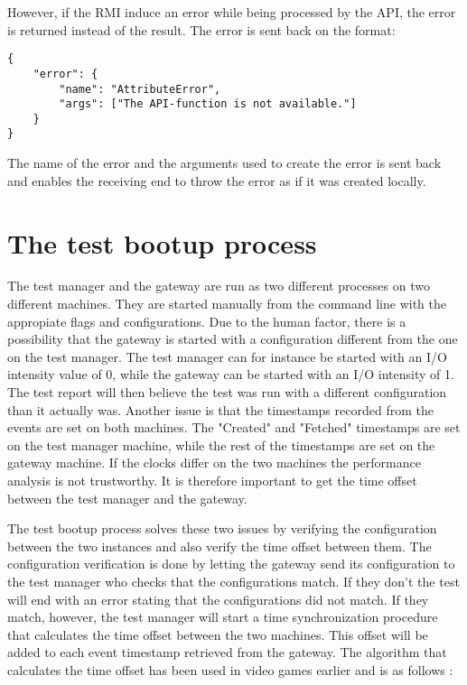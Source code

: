 However, if the RMI induce an error while being processed by the API, the error
is returned instead of the result. The error is sent back on the format:

\begin{lstlisting}
{
    "error": {
        "name": "AttributeError",
        "args": ["The API-function is not available."]
    }
}
\end{lstlisting}

The name of the error and the arguments used to create the error is sent back
and enables the receiving end to throw the error as if it was created locally.

\section{The test bootup process}

The test manager and the gateway are run as two different processes on two
different machines. They are started manually from the command line with the
appropiate flags and configurations. Due to the human factor, there is a
possibility that the gateway is started with a configuration different from the
one on the test manager. The test manager can for instance be started with an
I/O intensity value of 0, while the gateway can be started with an I/O
intensity of 1. The test report will then believe the test was run with a
different configuration than it actually was. Another issue is that the
timestamps recorded from the events are set on both machines. The "Created" and
"Fetched" timestamps are set on the test manager machine, while the rest of the
timestamps are set on the gateway machine. If the clocks differ on the two
machines the performance analysis is not trustworthy. It is therefore important
to get the time offset between the test manager and the gateway.

The test bootup process solves these two issues by verifying the configuration
between the two instances and also verify the time offset between them. The
configuration verification is done by letting the gateway send its
configuration to the test manager who checks that the configurations match. If
they don't the test will end with an error stating that the configurations did
not match. If they match, however, the test manager will start a time
synchronization procedure that calculates the time offset between the two
machines. This offset will be added to each event timestamp retrieved from the
gateway. The algorithm that calculates the time offset has been used in video
games earlier and is as follows \cite{simpson2004stream}:

